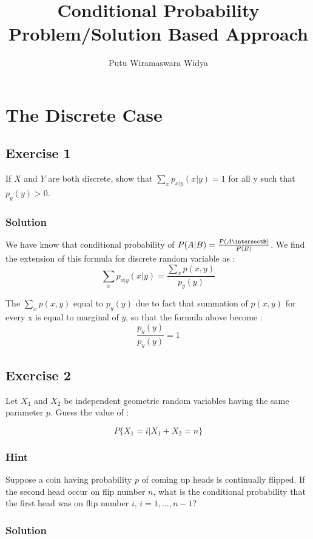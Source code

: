 \documentclass[12pt,a4paper]{article}
\begin{document}
\title {Conditional Probability\\ Problem/Solution Based Approach}
\author {Putu Wiramaswara Widya}
\maketitle

\section{The Discrete Case}
\subsection{Exercise 1}

If $X$ and $Y$ are both discrete, show that $\sum_xp_{x|y}(x|y) = 1$ for all y such that $p_y(y)>0$.

\subsubsection{Solution}
We have know that conditional probability of $P(A|B) = \frac{P(A\intersectB)}{P(B)}$. We find the extension of this formula for discrete random variable as :
\[
    \sum_xp_{x|y}(x|y) = \frac{\sum_xp(x,y)}{p_y(y)} 

\]

The $\sum_xp(x,y)$ equal to $p_y(y)$ due to fact that summation of $p(x,y)$ for every x is equal to marginal of $y$, so that the formula above become :
\[
    \frac{p_y(y)}{p_y(y)} = 1
\]

\subsection{Exercise 2}
Let $X_1$ and $X_2$ be independent geometric random variables having the same parameter $p$. Guess the value of :

\[
    P\{X_1 = i | X_1 + X_2 = n\}

\]

\subsubsection{Hint}
Suppose a coin having probability $p$ of coming up heads is continually flipped. If the second head occur on flip number $n$, what is the conditional probability that the first head was on flip number $i$, $i = 1, \dots, n-1$?

\subsubsection{Solution}
\end{document}
